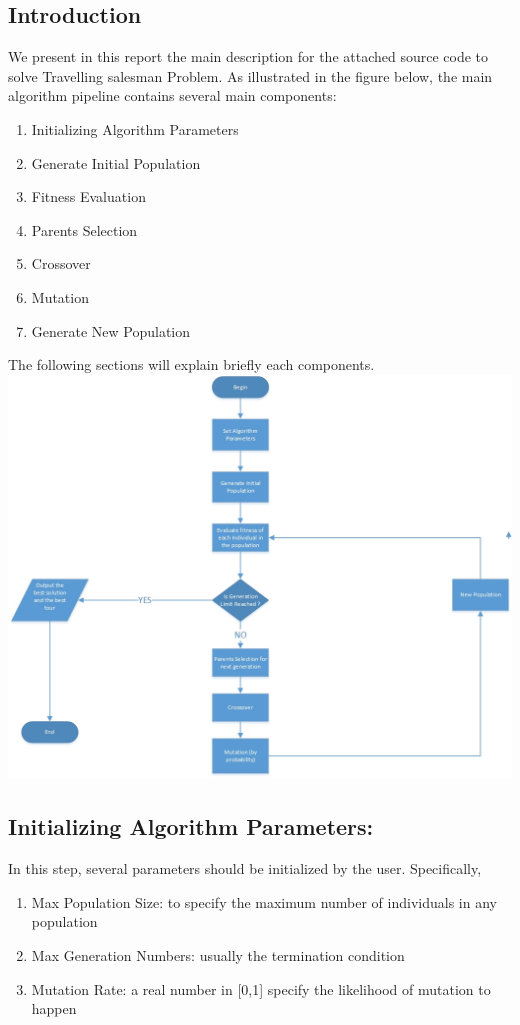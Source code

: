 \documentclass[11pt, english]{article}
\begin{document}
\subsection{Introduction}
We present in this report the main description for the attached source code to solve Travelling salesman Problem. \newline \newline
As illustrated in the figure below, the main algorithm pipeline contains several main components:
\begin{enumerate}
    \item Initializing Algorithm Parameters
    \item Generate Initial Population
    \item Fitness Evaluation
    \item Parents Selection
    \item Crossover
    \item Mutation
    \item Generate New Population
\end{enumerate}
The following sections will explain briefly each components.
\newline \newline
\includegraphics[width=\textwidth]{tsp-genetic-flowchart.jpg}

\subsection{Initializing Algorithm Parameters:}
In this step, several parameters should be initialized by the user. Specifically, \begin{enumerate}
    \item Max Population Size: 
    to specify the maximum number of individuals in any population
    \item Max Generation Numbers: usually the termination condition
    \item Mutation Rate: a real number in [0,1] specify the likelihood of mutation to happen
\end{enumerate}
\end{document}
